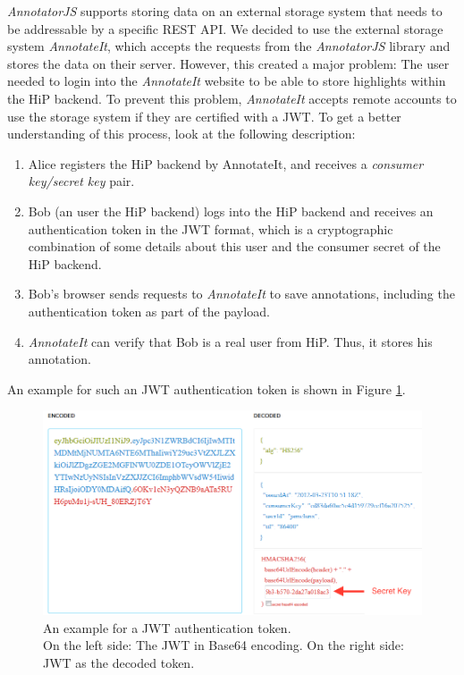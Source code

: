 \emph{AnnotatorJS} supports storing data on an external storage system that needs to be addressable by a specific \ac{REST} \ac{API}. We decided to use the external storage system \emph{AnnotateIt}, which accepts the requests from the \emph{AnnotatorJS} library and stores the data on their server. However, this created a major problem: The user needed to login into the \emph{AnnotateIt} website to be able to store highlights within the \ac{HiP} backend. To prevent this problem, \emph{AnnotateIt} accepts remote accounts to use the storage system if they are certified with a \ac{JWT}. To get a better understanding of this process, look at the following description:

\begin{enumerate}
\item Alice registers the \ac{HiP} backend by AnnotateIt, and receives a \emph{consumer key/secret key} pair.
\item Bob (an user the \ac{HiP} backend) logs into the \ac{HiP} backend and receives an authentication token in the \ac{JWT} format, which is a cryptographic combination of some details about this user and the consumer secret of the \ac{HiP} backend.
\item Bob's browser sends requests to \emph{AnnotateIt} to save annotations, including the authentication token as part of the payload.
\item \emph{AnnotateIt} can verify that Bob is a real user from \ac{HiP}. Thus, it stores his annotation.
\end{enumerate}

An example for such an \ac{JWT} authentication token is shown in Figure \ref{JWT}.

\begin{figure}[th]
\centerline{\includegraphics[width=1\textwidth]{gfx/JWT_b}}
\caption{An example for a JWT authentication token. \\On the left side: The JWT in Base64 encoding. On the right side: JWT as the decoded token.}
\label{JWT}
\end{figure}


